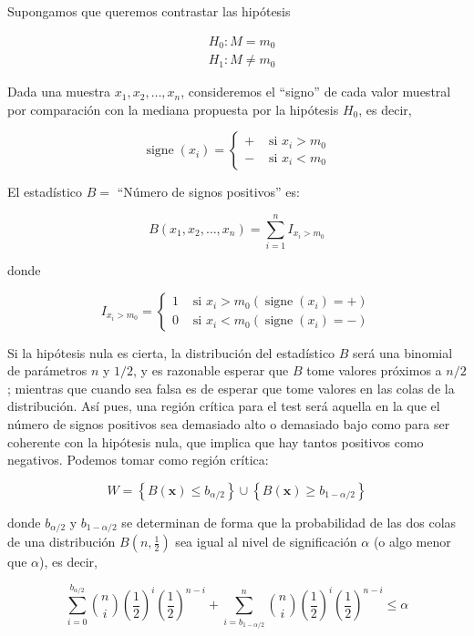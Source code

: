 \documentclass[
]{article}
\begin{document}
Supongamos que queremos contrastar las hipótesis

\[
\begin{aligned}
& H_{0}: M=m_{0} \\
& H_{1}: M \neq m_{0}
\end{aligned}
\]

Dada una muestra \(x_{1}, x_{2}, \ldots, x_{n}\), consideremos el ``signo'' de cada valor muestral por comparación con la mediana propuesta por la hipótesis \(H_{0}\), es decir,

\[
\operatorname{signe}\left(x_{i}\right)= \begin{cases}+ & \text { si } x_{i}>m_{0} \\ - & \text { si } x_{i}<m_{0}\end{cases}
\]

El estadístico \(B=\) ``Número de signos positivos'' es:

\[
B\left(x_{1}, x_{2}, \ldots, x_{n}\right)=\sum_{i=1}^{n} I_{x_{i}>m_{0}}
\]

donde

\[
I_{x_{i}>m_{0}}=\left\{\begin{array}{cc}
1 & \text { si } x_{i}>m_{0}\left(\operatorname{signe}\left(x_{i}\right)=+\right) \\
0 & \text { si } x_{i}<m_{0}\left(\operatorname{signe}\left(x_{i}\right)=-\right)
\end{array}\right.
\]

Si la hipótesis nula es cierta, la distribución del estadístico \(B\) será una binomial de parámetros \(n\) y \(1/2\), y es razonable esperar que \(B\) tome valores próximos a \(n/2\); mientras que cuando sea falsa es de esperar que tome valores en las colas de la distribución. Así pues, una región crítica para el test será aquella en la que el número de signos positivos sea demasiado alto o demasiado bajo como para ser coherente con la hipótesis nula, que implica que hay tantos positivos como negativos. Podemos tomar como región crítica:

\[
W=\left\{B(\mathbf{x}) \leq b_{\alpha / 2}\right\} \cup\left\{B(\mathbf{x}) \geq b_{1-\alpha / 2}\right\}
\]

donde \(b_{\alpha / 2}\) y \(b_{1-\alpha / 2}\) se determinan de forma que la probabilidad de las dos colas de una distribución \(B\left(n, \frac{1}{2}\right)\) sea igual al nivel de significación \(\alpha\) (o algo menor que \(\alpha\)), es decir,

\[
\sum_{i=0}^{b_{\alpha / 2}}\binom{n}{i}\left(\frac{1}{2}\right)^{i}\left(\frac{1}{2}\right)^{n-i}+\sum_{i=b_{1-\alpha / 2}}^{n}\binom{n}{i}\left(\frac{1}{2}\right)^{i}\left(\frac{1}{2}\right)^{n-i} \leq \alpha
\]
\end{document}
